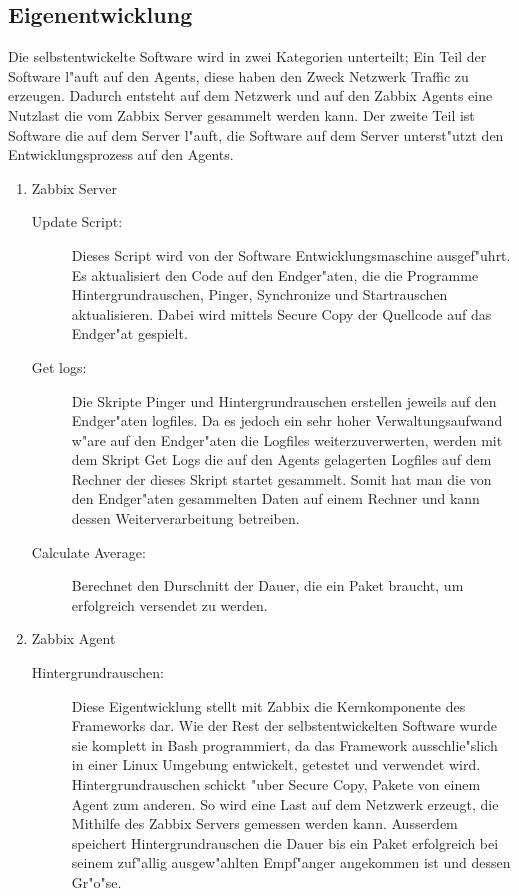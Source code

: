 \subsection{Eigenentwicklung}
Die selbstentwickelte Software wird in zwei Kategorien unterteilt; Ein Teil der Software l"auft %
auf den Agents, diese haben den Zweck Netzwerk Traffic zu erzeugen. Dadurch entsteht auf dem Netzwerk und %
auf den Zabbix Agents eine Nutzlast die vom Zabbix Server gesammelt werden kann. Der zweite Teil ist Software %
die auf dem Server l"auft, die Software auf dem Server unterst"utzt den Entwicklungsprozess auf den Agents. %
\begin{enumerate}
\item Zabbix Server 
\begin{description}
\item[Update Script:]Dieses Script wird von der Software Entwicklungsmaschine ausgef"uhrt. Es aktualisiert den Code auf den Endger"aten, %
die die Programme Hintergrundrauschen, Pinger, Synchronize und Startrauschen aktualisieren. Dabei wird mittels Secure Copy %
der Quellcode auf das Endger"at gespielt.

\item[Get logs:]Die Skripte Pinger und Hintergrundrauschen erstellen jeweils auf den Endger"aten logfiles. %
Da es jedoch ein sehr hoher Verwaltungsaufwand w"are auf den Endger"aten die Logfiles weiterzuverwerten, %
werden mit dem Skript Get Logs die auf den Agents gelagerten Logfiles auf dem Rechner der dieses Skript %
startet gesammelt. Somit hat man die von den Endger"aten gesammelten Daten auf einem Rechner und kann %
dessen Weiterverarbeitung betreiben.      

\item[Calculate Average:]Berechnet den Durschnitt der Dauer, die ein Paket braucht, um erfolgreich versendet %
zu werden.
 
\end{description}
\item Zabbix Agent

\begin{description}
\item[Hintergrundrauschen:]Diese Eigentwicklung stellt mit Zabbix die Kernkomponente des Frameworks dar. Wie %
der Rest der selbstentwickelten Software wurde sie komplett in Bash programmiert, da das Framework ausschlie"slich %
in einer Linux Umgebung entwickelt, getestet und verwendet wird. Hintergrundrauschen schickt "uber Secure Copy, %
Pakete von einem Agent zum anderen. So wird eine %
Last auf dem Netzwerk erzeugt, die Mithilfe des Zabbix Servers gemessen werden kann. Ausserdem speichert Hintergrundrauschen %
die Dauer bis ein Paket erfolgreich bei seinem zuf"allig ausgew"ahlten Empf"anger angekommen ist und dessen Gr"o"se. %


\end{description}
\end{enumerate}
